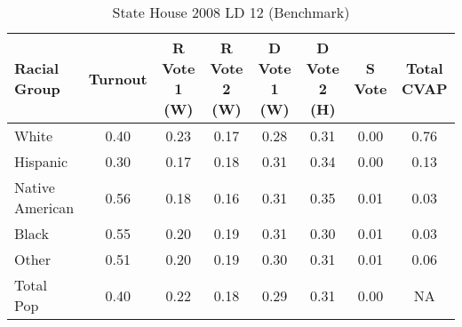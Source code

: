 \begin{table}[!h]
\begin{center}
\caption{State House 2008 LD 12 (Benchmark)}
\label{sthse08_cvap_ld_12}
\begin{tabular}{lccccccc}
  \hline
Racial Group & Turnout & R Vote 1 (W) & R Vote 2 (W) & D Vote 1 (W) & D Vote 2 (H) & S Vote & Total CVAP \\ 
  \hline
    White & 0.40  & 0.23  & 0.17  & 0.28  & 0.31  & 0.00  & 0.76 \\
    Hispanic & 0.30  & 0.17  & 0.18  & 0.31  & 0.34  & 0.00  & 0.13 \\
    Native American & 0.56  & 0.18  & 0.16  & 0.31  & 0.35  & 0.01  & 0.03 \\
    Black & 0.55  & 0.20  & 0.19  & 0.31  & 0.30  & 0.01  & 0.03 \\
    Other & 0.51  & 0.20  & 0.19  & 0.30  & 0.31  & 0.01  & 0.06 \\
    Total Pop & 0.40  & 0.22  & 0.18  & 0.29  & 0.31  & 0.00  & NA \\
    \hline
\end{tabular}
\end{center}
\end{table}